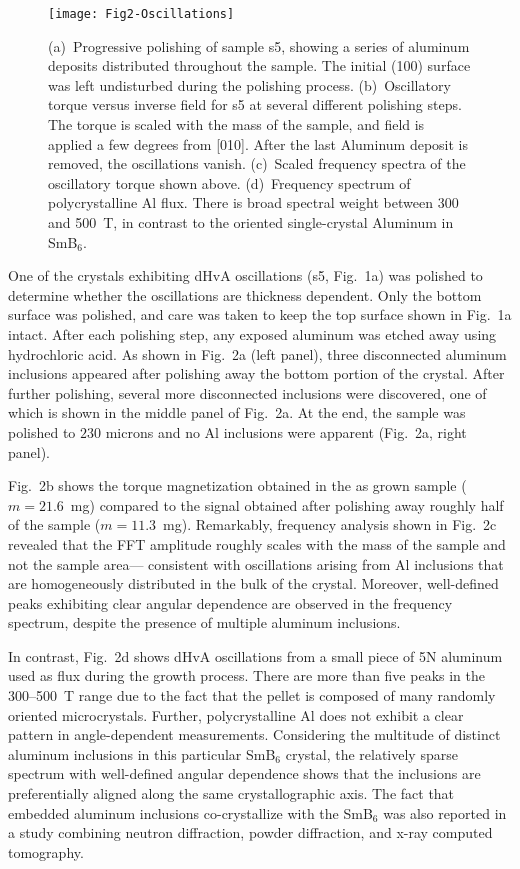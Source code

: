 \documentclass[twocolumn,preprintnumbers,amsmath,amssymb]{revtex4}
\begin{document}
\begin{figure}[!ht]
\begin{center}
\texttt{[image: Fig2-Oscillations]}
\vspace{-0.7cm}
\end{center}
\caption{
(a)~Progressive polishing of sample s5, showing a series of aluminum deposits distributed throughout the sample. The initial (100) surface was left undisturbed during the polishing process.
(b)~Oscillatory torque versus inverse field for s5 at several different polishing steps.
The torque is scaled with the mass of the sample, and field is applied a few degrees from [010].
After the last Aluminum deposit is removed, the oscillations vanish.
(c)~Scaled frequency spectra of the oscillatory torque shown above.
(d)~Frequency spectrum of polycrystalline Al flux. There is broad spectral weight between 300 and 500~T, in contrast to the oriented single-crystal Aluminum in SmB$_6$.
}\label{fig:al_inclusion}
\end{figure}


One of the crystals exhibiting dHvA oscillations (s5, Fig.~1a) was polished to determine whether the oscillations are thickness dependent.
Only the bottom surface was polished, and care was taken to keep the top surface shown in Fig.~1a intact.
After each polishing step, any exposed aluminum was etched away using hydrochloric acid.
As shown in Fig.~2a (left panel), three disconnected aluminum inclusions appeared after polishing away the bottom portion of the crystal.
After further polishing, several more disconnected inclusions were discovered, one of which is shown in the middle panel of Fig.~2a.
At the end, the sample was polished to $230$ microns and no Al inclusions were apparent (Fig.~2a, right panel).

Fig.~2b shows the torque magnetization obtained in the as grown sample ($m = 21.6$~mg) compared to the signal obtained after polishing away roughly half of the sample  ($m = 11.3$~mg).
Remarkably, frequency analysis shown in Fig.~2c revealed that the FFT amplitude roughly scales with the mass of the sample and not the sample area---
consistent with oscillations arising from Al inclusions that are homogeneously distributed in the bulk of the crystal.
Moreover, well-defined peaks exhibiting clear angular dependence are observed in the frequency spectrum, despite the presence of multiple aluminum inclusions.

In contrast, Fig.~2d shows dHvA oscillations from a small piece of 5N aluminum used as flux during the growth process.
There are more than five peaks in the 300--500~T range due to the fact that the pellet is composed of many randomly oriented microcrystals.
Further, polycrystalline Al does not exhibit a clear pattern in angle-dependent measurements.\cite{Li2014}
Considering the multitude of distinct aluminum inclusions in this particular SmB$_6$ crystal,
the relatively sparse spectrum with well-defined angular dependence shows that the inclusions are preferentially aligned along the same crystallographic axis.
The fact that embedded aluminum inclusions co-crystallize with the SmB$_6$ was also reported in a study combining neutron diffraction, powder diffraction, and x-ray computed tomography.\cite{Phelan2016a}
\end{document}

